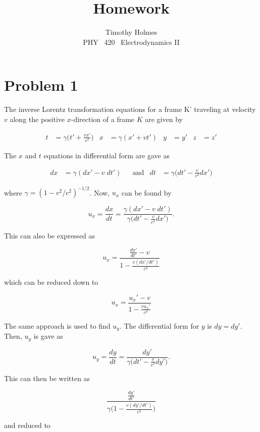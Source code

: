 \documentclass[11pt]{article}
\newcommand{\HWnum}{}
\newcommand{\CourseNum}{420}           %
\newcommand{\Subject}{PHY}
\begin{document}

\title{Homework {\HWnum}}
\author{Timothy Holmes \\ \Subject ~ \CourseNum ~ Electrodynamics II}

\maketitle

\section*{Problem 1}

The inverse Lorentz transformation equations for a frame K' traveling at velocity $v$ along the positive $x$-direction of a frame $K$ are given by

\begin{align*}
    t &= \gamma \Bigg(t' + \frac{vx'}{c^{2}} \Bigg) & x &= \gamma(x' + vt') & y &= y' & z &= z'
\end{align*}

The $x$ and $t$ equations in differential form are gave as

\begin{align*}
    dx &= \gamma(dx' - v\; dt') && \text{and} &
    dt &= \gamma\Bigg(dt' - \frac{v}{c^{2}} dx'\Bigg)
\end{align*}

where $\gamma = (1 - v^{2}/c^{2})^{-1/2}$. Now,  $u_x$ can be found by

$$
u_x = \frac{dx}{dt} = \frac{ \gamma(dx' - v\; dt')}{\gamma\big(dt' - \frac{v}{c^{2}} dx'\big)}.
$$

This can also be expressed as

$$
u_{x} = \frac{\frac{dx'}{dt'} - v}{1 - \frac{v(dx'/dt')}{c^{2}}}
$$

which can be reduced down to

$$
u_{x} = \frac{u_{x}' - v}{1 - \frac{v u_{x}'}{c^{2}}}
$$

The same approach is used to find $u_{y}$. The differential form for $y$ is $dy = dy'$. Then,  $u_{y}$ is gave as

$$
u_{y} = \frac{dy}{dt} = \frac{dy'}{\gamma\big(dt' - \frac{v}{c^{2}} dy'\big)}.
$$

This can then be written as

$$
\frac{\frac{dy'}{dt'}}{\gamma\big(1 - \frac{v(dy'/dt')}{c^{2}}\big)}
$$

and reduced to 
\end{document}
